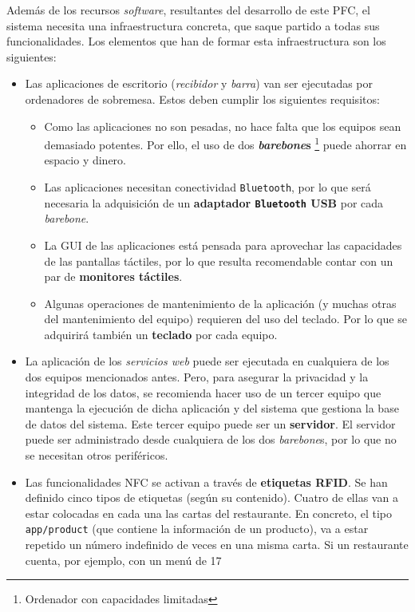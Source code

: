 Además de los recursos \emph{software}, resultantes del desarrollo de este
\acs{PFC}, el sistema necesita una infraestructura concreta, que saque
partido a todas sus funcionalidades. Los elementos que han de formar esta
infraestructura son los siguientes:
\begin{itemize}
\item Las aplicaciones de escritorio (\emph{recibidor} y \emph{barra}) van
ser ejecutadas por ordenadores de sobremesa. Estos deben cumplir los
siguientes requisitos:
  \begin{itemize}
  \item Como las aplicaciones no son pesadas, no hace falta que los equipos 
  sean demasiado potentes. Por ello, el uso de dos \textbf{\emph{barebone}s}
  \footnote{Ordenador con capacidades limitadas} puede ahorrar en espacio y 
  dinero.
  \item Las aplicaciones necesitan conectividad \texttt{Bluetooth}, por lo que
  será necesaria la adquisición de un \textbf{adaptador \texttt{Bluetooth}
  \acs{USB}} por cada \emph{barebone}.
  \item La \acs{GUI} de las aplicaciones está pensada para aprovechar las
  capacidades de las pantallas táctiles, por lo que resulta recomendable
  contar con un par de \textbf{monitores táctiles}.
  \item Algunas operaciones de mantenimiento de la aplicación (y muchas otras
  del mantenimiento del equipo) requieren del uso del teclado. Por lo que
  se adquirirá también un \textbf{teclado} por cada equipo.
  \end{itemize}
\item La aplicación de los \emph{servicios web} puede ser ejecutada en
cualquiera de los dos equipos mencionados antes. Pero, para asegurar la
privacidad y la integridad de los datos, se recomienda hacer uso de un tercer
equipo que mantenga la ejecución de dicha aplicación y del sistema que
gestiona la base de datos del sistema. Este tercer equipo puede ser un
\textbf{servidor}. El servidor puede ser administrado desde cualquiera de los
dos \emph{barebone}s, por lo que no se necesitan otros periféricos.
\item Las funcionalidades \acs{NFC} se activan a través de \textbf{etiquetas
\acs{RFID}}. Se han definido cinco tipos de etiquetas (según su contenido).
Cuatro de ellas van a estar colocadas en cada una las cartas del restaurante. 
En concreto, el tipo \texttt{app/product} (que contiene la 
información de un producto), va a estar repetido un número indefinido de veces 
en una misma carta. Si un restaurante cuenta, por ejemplo, con un menú de 17 

\end{itemize}
